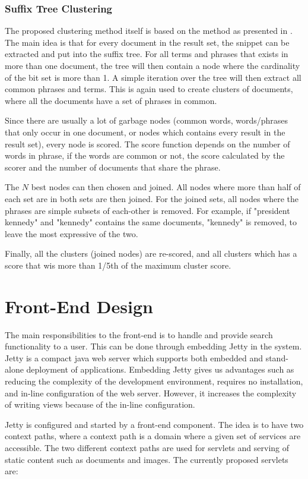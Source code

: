 \subsubsection{Suffix Tree Clustering}
The proposed clustering method itself is based on the method as presented in \cite{zamir}. The main idea is that for every document in the result set, the snippet can be extracted and put into the suffix tree. For all terms and phrases that exists in more than one document, the tree will then contain a node where the cardinality of the bit set is more than 1. A simple iteration over the tree will then extract all common phrases and terms. This is again used to create clusters of documents, where all the documents have a set of phrases in common.

Since there are usually a lot of garbage nodes (common words, words/phrases that only occur in one document, or nodes which contains every result in the result set), every node is scored. The score function depends on the number of words in phrase, if the words are common or not, the score calculated by the scorer and the number of documents that share the phrase. 

The $N$ best nodes can then chosen and joined. All nodes where more than half of each set are in both sets are then joined. For the joined sets,  all nodes where the phrases are simple subsets of each-other is removed. For example, if "president kennedy" and "kennedy" contains the same documents, "kennedy" is removed, to leave the most expressive of the two.

Finally, all the clusters (joined nodes) are re-scored, and all clusters which has a score that wis more than 1/5th of the maximum cluster score.

\section{Front-End Design}
The main responsibilities to the front-end is to handle and provide search functionality to a user. This can be done through embedding Jetty in the system. Jetty is a compact java web server which supports both embedded and stand-alone deployment of applications. Embedding Jetty gives us advantages such as reducing the complexity of the development environment, requires no installation, and in-line configuration of the web server. However, it increases the complexity of writing views because of the in-line configuration.

Jetty is configured and started by a front-end component. The idea is to have two context paths, where a context path is a domain where a given set of services are accessible. The two different context paths are used for servlets and serving of static content such as documents and images. The currently proposed servlets are:


